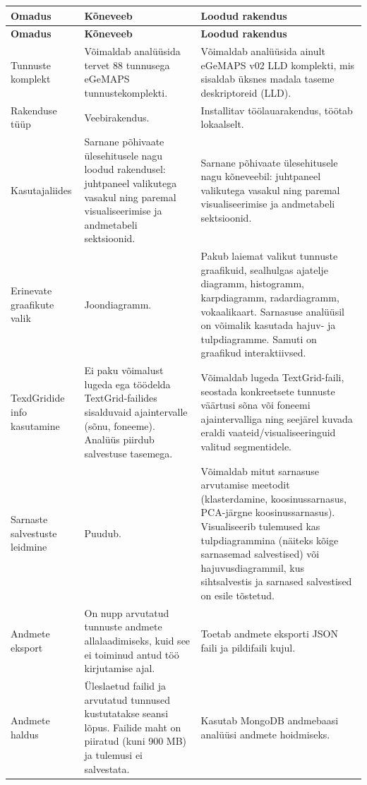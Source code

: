 \begin{longtable}{|p{2.5cm}|p{5.5cm}|p{5.5cm}|}
    \hline
    \textbf{Omadus} & \textbf{Kõneveeb} & \textbf{Loodud rakendus} \\
    \hline
    \endfirsthead
    \hline
    \textbf{Omadus} & \textbf{Kõneveeb} & \textbf{Loodud rakendus} \\
    \hline
    \endhead
    \hline
    \endfoot
    \hline
    \endlastfoot
    
    Tunnuste komplekt &
    Võimaldab analüüsida tervet 88 tunnusega eGeMAPS tunnustekomplekti. &
    Võimaldab analüüsida ainult eGeMAPS v02 LLD komplekti, mis sisaldab üksnes madala taseme deskriptoreid (LLD). \\
    \hline
    
    Rakenduse tüüp &
    Veebirakendus. &
    Installitav töölauarakendus, töötab lokaalselt. \\
    \hline
    
    Kasutajaliides &
    Sarnane põhivaate ülesehitusele nagu loodud rakendusel: juhtpaneel valikutega vasakul ning paremal visualiseerimise ja andmetabeli sektsioonid. &
    Sarnane põhivaate ülesehitusele nagu kõneveebil: juhtpaneel valikutega vasakul ning paremal visualiseerimise ja andmetabeli sektsioonid. \\
    \hline
    
    Erinevate graafikute valik &
    Joondiagramm. &
    Pakub laiemat valikut tunnuste graafikuid, sealhulgas ajatelje diagramm, histogramm, karpdiagramm, radardiagramm, vokaalikaart. Sarnasuse analüüsil on võimalik kasutada hajuv- ja tulpdiagramme. Samuti on graafikud interaktiivsed. \\
    \hline
    
    TexdGridide info kasutamine &
    Ei paku võimalust lugeda ega töödelda TextGrid-failides sisalduvaid ajaintervalle (sõnu, foneeme). Analüüs piirdub salvestuse tasemega. &
    Võimaldab lugeda TextGrid-faili, seostada konkreetsete tunnuste väärtusi sõna või foneemi ajaintervalliga ning seejärel kuvada eraldi vaateid/visualiseeringuid valitud segmentidele. \\
    \hline
    
    Sarnaste salvestuste leidmine &
    Puudub. &
    Võimaldab mitut sarnasuse arvutamise meetodit (klasterdamine, koosinussarnasus, PCA-järgne koosinussarnasus). Visualiseerib tulemused kas tulpdiagrammina (näiteks kõige sarnasemad salvestised) või hajuvusdiagrammil, kus sihtsalvestis ja sarnased salvestised on esile tõstetud. \\
    \hline
    
    Andmete eksport &
    On nupp arvutatud tunnuste andmete allalaadimiseks, kuid see ei toiminud antud töö kirjutamise ajal. &
    Toetab andmete eksporti JSON faili ja pildifaili kujul. \\
    \hline
    
    Andmete haldus &
    Üleslaetud failid ja arvutatud tunnused kustutatakse seansi lõpus. Failide maht on piiratud (kuni 900 MB) ja tulemusi ei salvestata. &
    Kasutab MongoDB andmebaasi analüüsi andmete hoidmiseks. \\
    \hline

\end{longtable}

